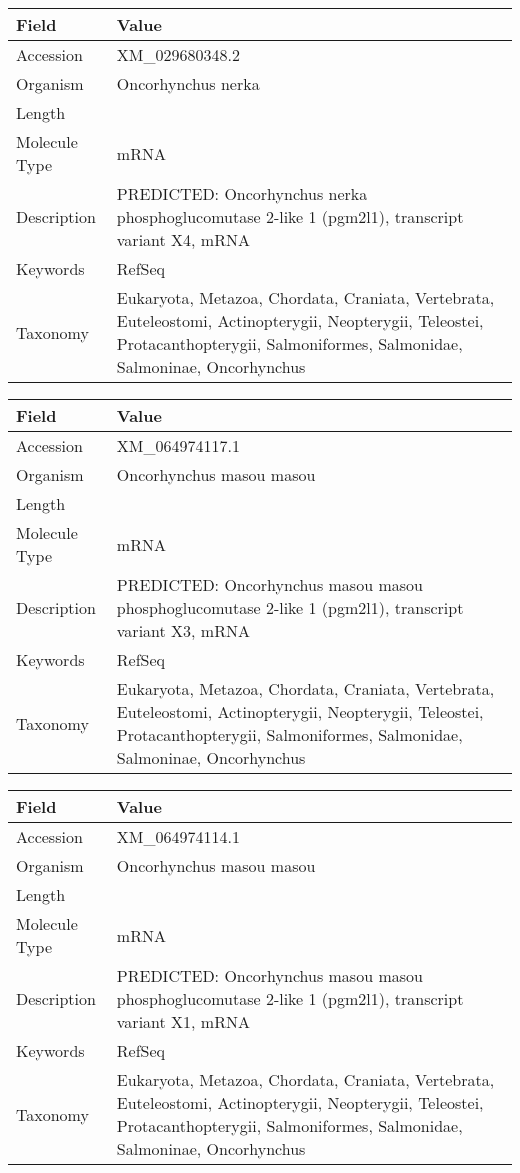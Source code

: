 \documentclass[10pt]{article}
\begin{document}
{\footnotesize
\begin{longtable}{>{\raggedright\arraybackslash}p{4.5cm} >{\raggedright\arraybackslash}p{11.5cm}}
\textbf{Field} & \textbf{Value} \\
\hline
Accession & XM\_029680348.2 \\
Organism & Oncorhynchus nerka \\
Length & 3919 \\
Molecule Type & mRNA \\
Description & PREDICTED: Oncorhynchus nerka phosphoglucomutase 2-like 1 (pgm2l1), transcript variant X4, mRNA \\
Keywords & RefSeq \\
Taxonomy & Eukaryota, Metazoa, Chordata, Craniata, Vertebrata, Euteleostomi, Actinopterygii, Neopterygii, Teleostei, Protacanthopterygii, Salmoniformes, Salmonidae, Salmoninae, Oncorhynchus \\
\end{longtable}
}

{\footnotesize
\begin{longtable}{>{\raggedright\arraybackslash}p{4.5cm} >{\raggedright\arraybackslash}p{11.5cm}}
\textbf{Field} & \textbf{Value} \\
\hline
Accession & XM\_064974117.1 \\
Organism & Oncorhynchus masou masou \\
Length & 4123 \\
Molecule Type & mRNA \\
Description & PREDICTED: Oncorhynchus masou masou phosphoglucomutase 2-like 1 (pgm2l1), transcript variant X3, mRNA \\
Keywords & RefSeq \\
Taxonomy & Eukaryota, Metazoa, Chordata, Craniata, Vertebrata, Euteleostomi, Actinopterygii, Neopterygii, Teleostei, Protacanthopterygii, Salmoniformes, Salmonidae, Salmoninae, Oncorhynchus \\
\end{longtable}
}

{\footnotesize
\begin{longtable}{>{\raggedright\arraybackslash}p{4.5cm} >{\raggedright\arraybackslash}p{11.5cm}}
\textbf{Field} & \textbf{Value} \\
\hline
Accession & XM\_064974114.1 \\
Organism & Oncorhynchus masou masou \\
Length & 4647 \\
Molecule Type & mRNA \\
Description & PREDICTED: Oncorhynchus masou masou phosphoglucomutase 2-like 1 (pgm2l1), transcript variant X1, mRNA \\
Keywords & RefSeq \\
Taxonomy & Eukaryota, Metazoa, Chordata, Craniata, Vertebrata, Euteleostomi, Actinopterygii, Neopterygii, Teleostei, Protacanthopterygii, Salmoniformes, Salmonidae, Salmoninae, Oncorhynchus \\
\end{longtable}
}
\end{document}
